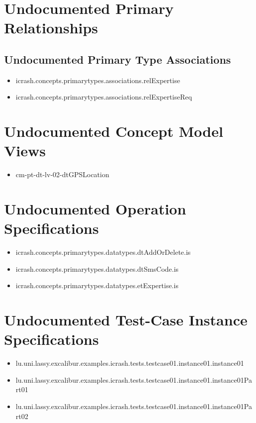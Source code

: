 \section[Undocumented Primary Type Relationships]{Undocumented Primary Relationships}

\subsection[Undocumented Primary Type Associations]{Undocumented Primary Type Associations}
\begin{itemize}
\item icrash.concepts.primarytypes.associations.relExpertise 
\item icrash.concepts.primarytypes.associations.relExpertiseReq 
\end{itemize}












\section[Undocumented Concept Model Views]{Undocumented Concept Model Views}
\begin{itemize}
\item cm-pt-dt-lv-02-dtGPSLocation 
\end{itemize}


\section[Undocumented Operation Specifications]{Undocumented Operation Specifications}
\begin{itemize}
\item icrash.concepts.primarytypes.datatypes.dtAddOrDelete.is 
\item icrash.concepts.primarytypes.datatypes.dtSmsCode.is 
\item icrash.concepts.primarytypes.datatypes.etExpertise.is 
\end{itemize}





\section[Undocumented Test-Case Instance Specifications]{Undocumented Test-Case Instance Specifications}
\begin{itemize}
\item lu.uni.lassy.excalibur.examples.icrash.tests.testcase01.instance01.instance01 
\item lu.uni.lassy.excalibur.examples.icrash.tests.testcase01.instance01.instance01Part01 
\item lu.uni.lassy.excalibur.examples.icrash.tests.testcase01.instance01.instance01Part02 
\end{itemize}



